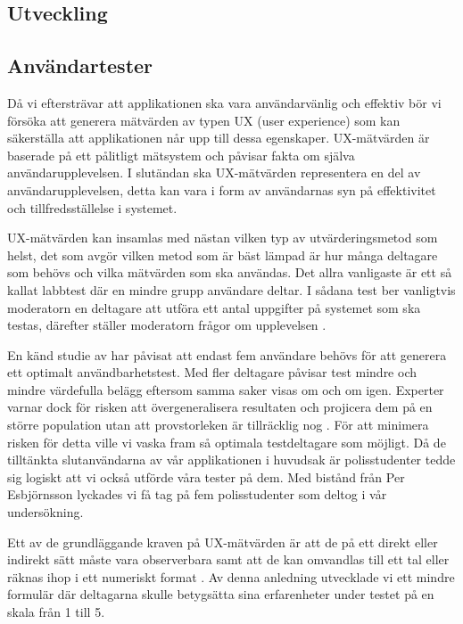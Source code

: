 \documentclass[swedish]{maucsthesis}
\begin{document}
\subsection{Utveckling}


\subsection{Användartester}

Då vi eftersträvar att applikationen ska vara användarvänlig och effektiv bör vi
försöka att generera mätvärden av typen UX (user experience) som kan säkerställa
att applikationen når upp till dessa egenskaper. UX-mätvärden är baserade på ett
pålitligt mätsystem och påvisar fakta om själva användarupplevelsen. I slutändan
ska UX-mätvärden representera en del av användarupplevelsen, detta kan vara i
form av användarnas syn på effektivitet och tillfredsställelse i systemet.

UX-mätvärden kan insamlas med nästan vilken typ av utvärderingsmetod som helst,
det som avgör vilken metod som är bäst lämpad är hur många deltagare som behövs
och vilka mätvärden som ska användas. Det allra vanligaste är ett så kallat
labbtest där en mindre grupp användare deltar. I sådana test ber vanligtvis
moderatorn en deltagare att utföra ett antal uppgifter på systemet som ska
testas, därefter ställer moderatorn frågor om upplevelsen \citep{tullis:2013}.

En känd studie av \citep{nielsen:2000} har påvisat att endast fem användare behövs för att
generera ett optimalt användbarhetstest. Med fler deltagare påvisar test mindre
och mindre värdefulla belägg eftersom samma saker visas om och om igen. Experter
varnar dock för risken att övergeneralisera resultaten och projicera dem på en
större population utan att provstorleken är tillräcklig nog \citep{tullis:2013}. För
att minimera risken för detta ville vi vaska fram så optimala testdeltagare som
möjligt. Då de tilltänkta slutanvändarna av vår applikationen i huvudsak är
polisstudenter tedde sig logiskt att vi också utförde våra tester på dem. Med
bistånd från Per Esbjörnsson lyckades vi få tag på fem polisstudenter som deltog
i vår undersökning.

Ett av de grundläggande kraven på UX-mätvärden är att de på ett direkt eller
indirekt sätt måste vara observerbara samt att de kan omvandlas till ett tal
eller räknas ihop i ett numeriskt format \citep{tullis:2013}. Av denna anledning
utvecklade vi ett mindre formulär där deltagarna skulle betygsätta sina
erfarenheter under testet på en skala från 1 till 5.
\end{document}
